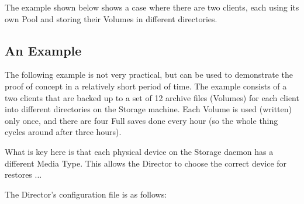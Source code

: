 The example shown below shows a case where there are two clients, each
using its own Pool and storing their Volumes in different directories.


\subsection{An Example}

The following example is not very practical, but can be used to demonstrate
the proof of concept in a relatively short period of time. The example
consists of a two clients that are backed up to a set of 12 archive files
(Volumes) for each client into different directories on the Storage
machine.  Each Volume is used (written) only once, and there are four Full
saves done every hour (so the whole thing cycles around after three hours).

What is key here is that each physical device on the Storage daemon
has a different Media Type. This allows the Director to choose the
correct device for restores ...

The Director's configuration file is as follows:

